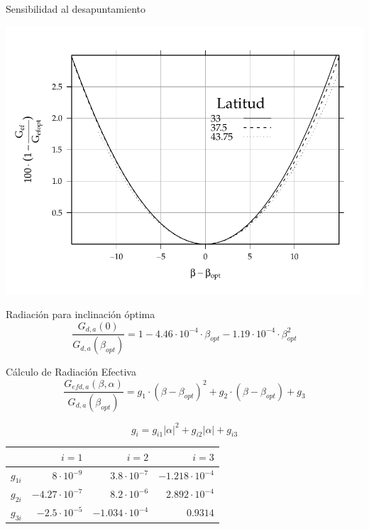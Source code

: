 \documentclass[xcolor={usenames,svgnames,dvipsnames}]{beamer}
\begin{document}
\begin{frame}[label={sec:orgda9f620}]{Sensibilidad al desapuntamiento}
\begin{center}
\includegraphics[width=.9\linewidth]{../figs/PerdidasInclinacionOptima.pdf}
\end{center}
\end{frame}

\begin{frame}[label={sec:org76754aa}]{Radiación para inclinación óptima}
\[\frac{G_{d,a}(0)}{G_{d,a}(\beta_{opt})}=1-4.46\cdot10^{-4}\cdot\beta_{opt}-1.19\cdot10^{-4}\cdot\beta_{opt}^{2}\]
\end{frame}

\begin{frame}[label={sec:org3400ba7}]{Cálculo de Radiación Efectiva}
\[
\frac{G_{efd,a}(\beta,\alpha)}{G_{d,a}(\beta_{opt})} = g_{1}\cdot(\beta-\beta_{opt})^{2}+g_{2}\cdot(\beta-\beta_{opt})+g_{3}
\]

\[
g_{i} = g_{i1}|\alpha|^{2}+g_{i2}|\alpha|+g_{i3}
\]

\begin{center}
\begin{tabular}{lrrr}
 & \(i=1\) & \(i=2\) & \(i=3\)\\
\hline
\(g_{1i}\) & \(8\cdot10^{-9}\) & \(3.8\cdot10^{-7}\) & \(-1.218\cdot10^{-4}\)\\
\(g_{2i}\) & \(-4.27\cdot10^{-7}\) & \(8.2\cdot10^{-6}\) & \(2.892\cdot10^{-4}\)\\
\(g_{3i}\) & \(-2.5\cdot10^{-5}\) & \(-1.034\cdot10^{-4}\) & \(0.9314\)\\
\end{tabular}
\end{center}
\end{frame}
\end{document}
